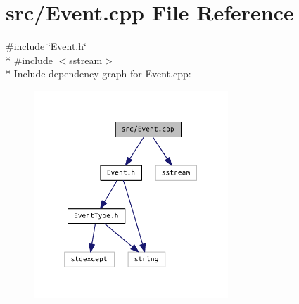 \section{src/\+Event.cpp File Reference}
\label{_event_8cpp}
{\ttfamily \#include \char`\"{}Event.\+h\char`\"{}}\\*
{\ttfamily \#include $<$sstream$>$}\\*
Include dependency graph for Event.\+cpp\+:
\nopagebreak
\begin{figure}[H]
\begin{center}
\leavevmode
\includegraphics[width=207pt]{_event_8cpp__incl}
\end{center}
\end{figure}
